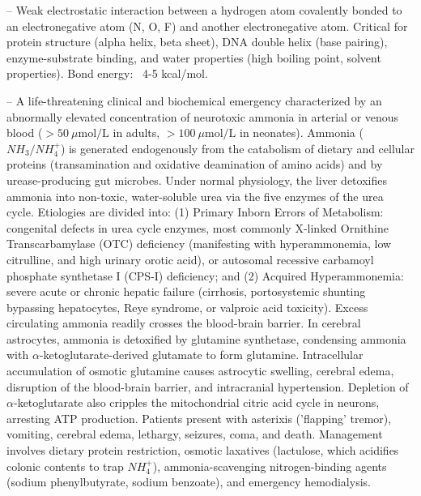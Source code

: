 -- Weak electrostatic interaction between a hydrogen atom covalently bonded to an electronegative atom (N, O, F) and another electronegative atom. Critical for protein structure (alpha helix, beta sheet), DNA double helix (base pairing), enzyme-substrate binding, and water properties (high boiling point, solvent properties). Bond energy: ~4-5 kcal/mol.

-- A life-threatening clinical and biochemical emergency characterized by an abnormally elevated concentration of neurotoxic ammonia in arterial or venous blood ($>50 \ \mu\text{mol/L}$ in adults, $>100 \ \mu\text{mol/L}$ in neonates). Ammonia ($NH_3/NH_4^+$) is generated endogenously from the catabolism of dietary and cellular proteins (transamination and oxidative deamination of amino acids) and by urease-producing gut microbes. Under normal physiology, the liver detoxifies ammonia into non-toxic, water-soluble urea via the five enzymes of the urea cycle. Etiologies are divided into: (1) Primary Inborn Errors of Metabolism: congenital defects in urea cycle enzymes, most commonly X-linked Ornithine Transcarbamylase (OTC) deficiency (manifesting with hyperammonemia, low citrulline, and high urinary orotic acid), or autosomal recessive carbamoyl phosphate synthetase I (CPS-I) deficiency; and (2) Acquired Hyperammonemia: severe acute or chronic hepatic failure (cirrhosis, portosystemic shunting bypassing hepatocytes, Reye syndrome, or valproic acid toxicity). Excess circulating ammonia readily crosses the blood-brain barrier. In cerebral astrocytes, ammonia is detoxified by glutamine synthetase, condensing ammonia with $\alpha$-ketoglutarate-derived glutamate to form glutamine. Intracellular accumulation of osmotic glutamine causes astrocytic swelling, cerebral edema, disruption of the blood-brain barrier, and intracranial hypertension. Depletion of $\alpha$-ketoglutarate also cripples the mitochondrial citric acid cycle in neurons, arresting ATP production. Patients present with asterixis ('flapping' tremor), vomiting, cerebral edema, lethargy, seizures, coma, and death. Management involves dietary protein restriction, osmotic laxatives (lactulose, which acidifies colonic contents to trap $NH_4^+$), ammonia-scavenging nitrogen-binding agents (sodium phenylbutyrate, sodium benzoate), and emergency hemodialysis.


